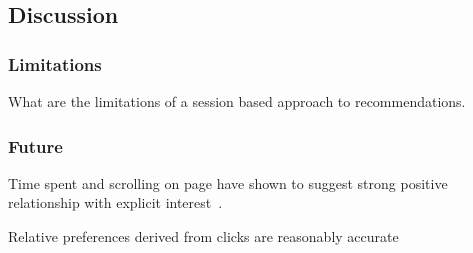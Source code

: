 \subsection{Discussion}

\subsubsection{Limitations}
    What are the limitations of a session based approach to recommendations.

\subsubsection{Future}
    Time spent and scrolling on page have shown to suggest strong positive relationship with explicit interest~\cite{Claypool01inferringuser}.

    Relative preferences derived from clicks are reasonably accurate~\cite{Joachims:2007:EAI:1229179.1229181}
